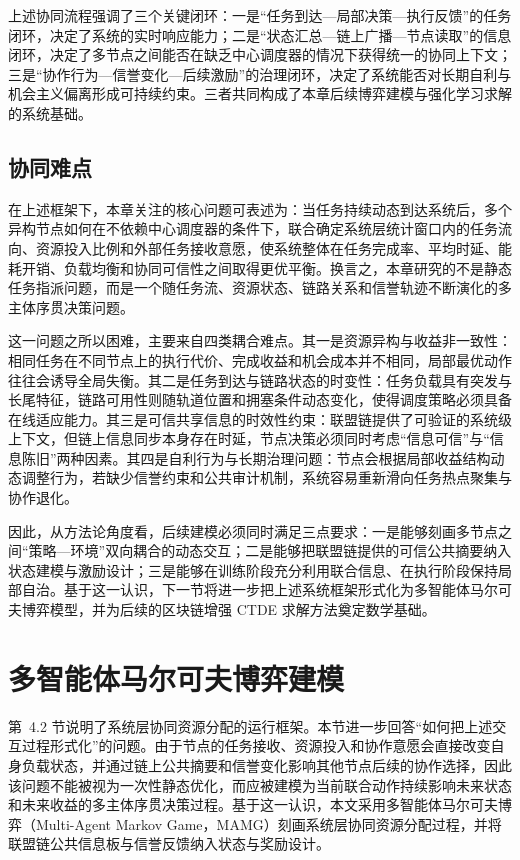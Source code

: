 上述协同流程强调了三个关键闭环：一是“任务到达—局部决策—执行反馈”的任务闭环，决定了系统的实时响应能力；二是“状态汇总—链上广播—节点读取”的信息闭环，决定了多节点之间能否在缺乏中心调度器的情况下获得统一的协同上下文；三是“协作行为—信誉变化—后续激励”的治理闭环，决定了系统能否对长期自利与机会主义偏离形成可持续约束。三者共同构成了本章后续博弈建模与强化学习求解的系统基础。

\subsection{协同难点}

在上述框架下，本章关注的核心问题可表述为：当任务持续动态到达系统后，多个异构节点如何在不依赖中心调度器的条件下，联合确定系统层统计窗口内的任务流向、资源投入比例和外部任务接收意愿，使系统整体在任务完成率、平均时延、能耗开销、负载均衡和协同可信性之间取得更优平衡。换言之，本章研究的不是静态任务指派问题，而是一个随任务流、资源状态、链路关系和信誉轨迹不断演化的多主体序贯决策问题。

这一问题之所以困难，主要来自四类耦合难点。其一是资源异构与收益非一致性：相同任务在不同节点上的执行代价、完成收益和机会成本并不相同，局部最优动作往往会诱导全局失衡。其二是任务到达与链路状态的时变性：任务负载具有突发与长尾特征，链路可用性则随轨道位置和拥塞条件动态变化，使得调度策略必须具备在线适应能力。其三是可信共享信息的时效性约束：联盟链提供了可验证的系统级上下文，但链上信息同步本身存在时延，节点决策必须同时考虑“信息可信”与“信息陈旧”两种因素。其四是自利行为与长期治理问题：节点会根据局部收益结构动态调整行为，若缺少信誉约束和公共审计机制，系统容易重新滑向任务热点聚集与协作退化。

因此，从方法论角度看，后续建模必须同时满足三点要求：一是能够刻画多节点之间“策略—环境”双向耦合的动态交互；二是能够把联盟链提供的可信公共摘要纳入状态建模与激励设计；三是能够在训练阶段充分利用联合信息、在执行阶段保持局部自治。基于这一认识，下一节将进一步把上述系统框架形式化为多智能体马尔可夫博弈模型，并为后续的区块链增强 CTDE 求解方法奠定数学基础。


\section{多智能体马尔可夫博弈建模}

第~4.2 节说明了系统层协同资源分配的运行框架。本节进一步回答“如何把上述交互过程形式化”的问题。由于节点的任务接收、资源投入和协作意愿会直接改变自身负载状态，并通过链上公共摘要和信誉变化影响其他节点后续的协作选择，因此该问题不能被视为一次性静态优化，而应被建模为当前联合动作持续影响未来状态和未来收益的多主体序贯决策过程。基于这一认识，本文采用多智能体马尔可夫博弈（Multi-Agent Markov Game，MAMG）刻画系统层协同资源分配过程，并将联盟链公共信息板与信誉反馈纳入状态与奖励设计。

